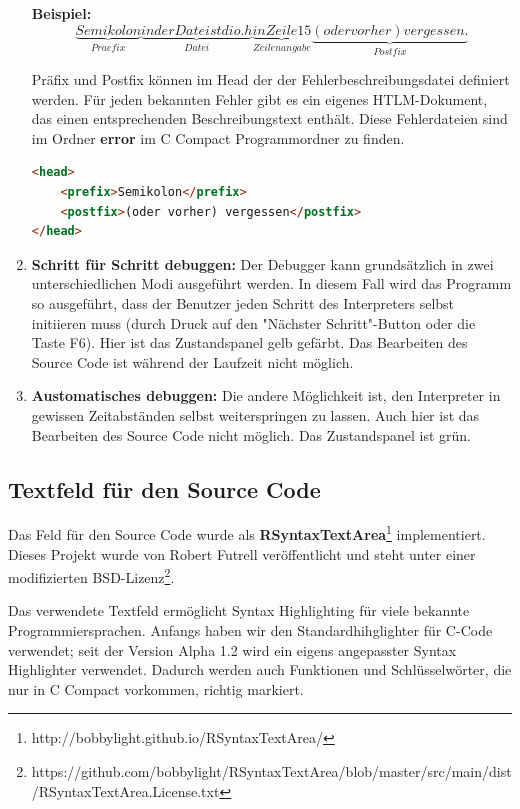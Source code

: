 \begin{enumerate}
\textbf{Beispiel:}
\[
\underbrace{Semikolon}_{Praefix} \underbrace{in der Datei stdio.h}_{Datei} \underbrace{in Zeile 15}_{Zeilenangabe} \underbrace{(oder vorher) vergessen.}_{Postfix}
\]

Präfix und Postfix können im Head der der Fehlerbeschreibungsdatei definiert werden. Für jeden bekannten Fehler gibt es ein eigenes HTLM-Dokument, das einen entsprechenden Beschreibungstext enthält. Diese Fehlerdateien sind im Ordner \textbf{error} im C Compact Programmordner zu finden.

\begin{lstlisting}[language=HTML]
<head>
	<prefix>Semikolon</prefix>
	<postfix>(oder vorher) vergessen</postfix>
</head>
\end{lstlisting}

\item \textbf{Schritt für Schritt debuggen:} Der Debugger kann grundsätzlich in zwei unterschiedlichen Modi ausgeführt werden. In diesem Fall wird das Programm so ausgeführt, dass der Benutzer jeden Schritt des Interpreters selbst initiieren muss (durch Druck auf den "Nächster Schritt"-Button oder die Taste F6). Hier ist das Zustandspanel gelb gefärbt. Das Bearbeiten des Source Code ist während der Laufzeit nicht möglich.

\item \textbf{Austomatisches debuggen:} Die andere Möglichkeit ist, den Interpreter in gewissen Zeitabständen selbst weiterspringen zu lassen. Auch hier ist das Bearbeiten des Source Code nicht möglich. Das Zustandspanel ist grün.
\end{enumerate}

\subsection{Textfeld für den Source Code}
\label{sec:gui-main-left-code}
Das Feld für den Source Code wurde als \textbf{RSyntaxTextArea}\footnote{http://bobbylight.github.io/RSyntaxTextArea/} implementiert. Dieses Projekt wurde von Robert Futrell veröffentlicht und steht unter einer modifizierten BSD-Lizenz\footnote{https://github.com/bobbylight/RSyntaxTextArea/blob/master/src/main/dist/RSyntaxTextArea.License.txt}.

Das verwendete Textfeld ermöglicht Syntax Highlighting für viele bekannte Programmiersprachen. Anfangs haben wir den Standardhihglighter für C-Code verwendet; seit der Version Alpha 1.2 wird ein eigens angepasster Syntax Highlighter verwendet. Dadurch werden auch Funktionen und Schlüsselwörter, die nur in C Compact vorkommen, richtig markiert.

